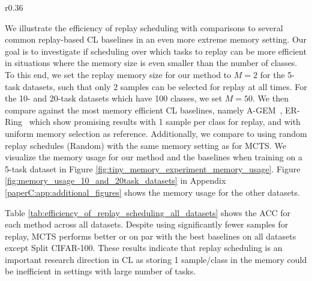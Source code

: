 \begin{wrapfigure}[12]{r}{0.36\textwidth}
	\centering
	\setlength{\figwidth}{0.33\textwidth}
	\setlength{\figheight}{.14\textheight}
	\vspace{-3mm}
	
	\vspace{-3mm}
	\captionsetup{width=.9\linewidth}
	\caption{
		Number of replayed samples per task for the 5-task datasets in the tiny memory setting. Ours use $M=2$ samples for replay, while the baselines increment their memory per task.
	}
	\label{fig:tiny_memory_experiment_memory_usage}
\end{wrapfigure}
We illustrate the efficiency of replay scheduling with comparisons to several common replay-based CL baselines in an even more extreme memory setting.
Our goal is to investigate if scheduling over which tasks to replay can be more efficient in situations where the memory size is even smaller than the number of classes. %
To this end, we set the replay memory size for our method
to $M=2$ for the 5-task datasets, such that only 2 samples can be selected for replay at all times. For the 10- and 20-task datasets which have 100 classes, we set $M=50$. We then compare against the most memory efficient CL baselines, namely A-GEM~, ER-Ring~ which show promising results with 1 sample per class for replay, %
and with uniform memory selection as reference. 
Additionally, we compare to using random replay schedules (Random) with the same memory setting as for MCTS.
We visualize the memory usage for our method and the baselines when training on a 5-task dataset in Figure \ref{fig:tiny_memory_experiment_memory_usage}. 
Figure \ref{fig:memory_usage_10_and_20task_datasets} in Appendix \ref{paperC:app:additional_figures} shows the memory usage for the other datasets. 

Table \ref{tab:efficiency_of_replay_scheduling_all_datasets} shows the ACC for each method across all datasets. Despite using significantly fewer samples for replay, MCTS performs better or on par with the best baselines on all datasets except Split CIFAR-100. 
These results indicate that replay scheduling is an important research direction in CL as storing 1 sample/class in the memory could be inefficient in settings with large number of tasks.


